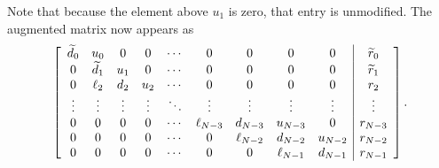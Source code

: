 Note that because the element above $u_1$ is zero, that entry is unmodified. The augmented matrix now appears as
\begin{align}
  \left[ \begin{array}{c c c c c c c c c | c} 
  \widetilde{d}_{0}    & u_{0}    & 0      & 0      & \cdots & 0          & 0          & 0        & 0       & \widetilde{r}_0	  \\
  0		   & \widetilde{d}_{1}    & u_{1}  & 0      & \cdots & 0          & 0          & 0        & 0       & \widetilde{r}_1	  \\
  0        & \ell_{2} & d_{2}  & u_{2}  & \cdots & 0          & 0          & 0        & 0       & r_2	  \\
  \vdots   & \vdots   & \vdots & \vdots & \ddots & \vdots     & \vdots     & \vdots   & \vdots  & \vdots  \\
  0        & 0        & 0      & 0      & \cdots & \ell_{N-3} & d_{N-3}    & u_{N-3}  & 0       & r_{N-3} \\
  0        & 0        & 0      & 0      & \cdots & 0		  & \ell_{N-2} & d_{N-2}  & u_{N-2} & r_{N-2} \\ 
  0        & 0        & 0      & 0      & \cdots & 0          & 0          & \ell_{N-1} & d_{N-1} & r_{N-1}  \\ 
  \end{array} \right] . \nonumber
\end{align}

